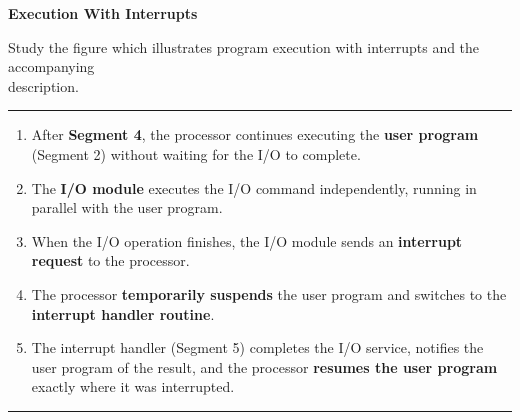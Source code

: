 \documentclass{article}
\begin{document}
\begin{examplebox}
    \textbf{Execution With Interrupts}

    Study the figure which illustrates program execution with interrupts and the accompanying \\ description.
    
    \noindent\rule{\textwidth}{0.4pt}
\begin{minipage}{0.65\textwidth}



\begin{enumerate}
    \item After \textbf{Segment 4}, the processor continues executing the \textbf{user program} (Segment 2) without waiting for the I/O to complete.
    \item The \textbf{I/O module} executes the I/O command independently, running in parallel with the user program.
    \item When the I/O operation finishes, the I/O module sends an \textbf{interrupt request} to the processor.
    \item The processor \textbf{temporarily suspends} the user program and switches to the \textbf{interrupt handler routine}.
    \item The interrupt handler (Segment 5) completes the I/O service, notifies the user program of the result, and the processor \textbf{resumes the user program} exactly where it was interrupted.
\end{enumerate}

\noindent\rule{\textwidth}{0.4pt}


\end{minipage}
\end{examplebox}
\end{document}
